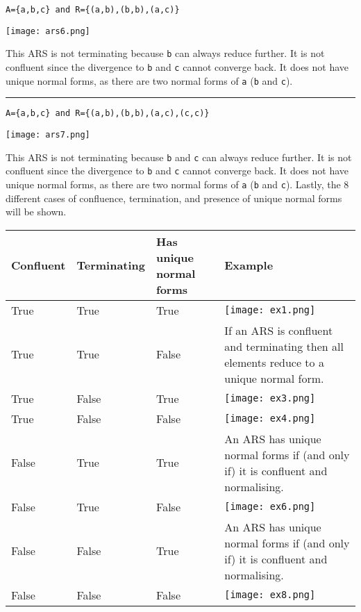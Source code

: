 \documentclass{article}
\theoremstyle{theorem}
\theoremstyle{definition}
\theoremstyle{remark}
\begin{document}
\noindent \texttt{A=\{a,b,c\} and R=\{(a,b),(b,b),(a,c)\}}
\begin{center}
    \texttt{[image: ars6.png]}
\end{center}
This ARS is not terminating because \texttt{b} can always reduce further. It is not confluent since the divergence to \texttt{b} and \texttt{c} cannot converge back. It does not have unique normal forms, as there are two normal forms of \texttt{a} (\texttt{b} and \texttt{c}).

\noindent\rule{\textwidth}{1pt}

\noindent \texttt{A=\{a,b,c\} and R=\{(a,b),(b,b),(a,c),(c,c)\}}
\begin{center}
    \texttt{[image: ars7.png]}
\end{center}
This ARS is not terminating because \texttt{b} and \texttt{c} can always reduce further. It is not confluent since the divergence to \texttt{b} and \texttt{c} cannot converge back. It does not have unique normal forms, as there are two normal forms of \texttt{a} (\texttt{b} and \texttt{c}).
\newpage
Lastly, the 8 different cases of confluence, termination, and presence of unique normal forms will be shown.

\begin{center}
\begin{tabular}{ | m{5em} | m{5em}| m{12em} | m{3.2cm} | }
 \hline
 Confluent & Terminating & Has unique normal forms & Example \\
 \hline\hline
 True & True & True & \texttt{[image: ex1.png]} \\ 
 \hline
 True & True & False & If an ARS is confluent and terminating then all elements reduce to a unique normal form. \\
 \hline
 True & False & True & \texttt{[image: ex3.png]} \\
 \hline
 True & False & False & \texttt{[image: ex4.png]} \\
 \hline
 False & True & True & An ARS has unique normal forms if (and only if) it is confluent and normalising. \\
 \hline
 False & True & False & \texttt{[image: ex6.png]} \\
 \hline
 False & False & True & An ARS has unique normal forms if (and only if) it is confluent and normalising. \\
 \hline
 False & False & False & \texttt{[image: ex8.png]} \\
 \hline
\end{tabular}
\end{center}
\end{document}
